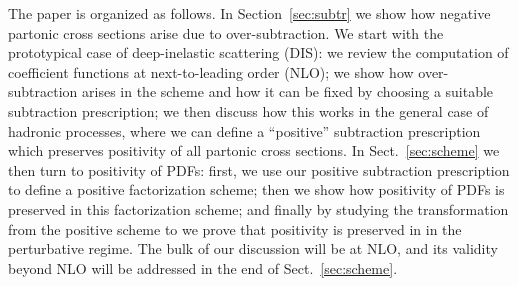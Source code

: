 The paper is organized as follows. In Section~\ref{sec:subtr} we show
how negative partonic cross sections arise due to over-subtraction. We
start with the   prototypical case of deep-inelastic scattering (DIS): we
review the computation of coefficient functions at next-to-leading
order (NLO); we show how over-subtraction arises in the \msbar{} scheme
and how it can be fixed by choosing a suitable subtraction
prescription; we then discuss how this works in the general case of
hadronic processes, where we can define a ``positive'' subtraction prescription
which preserves
positivity of all partonic cross sections.
In Sect.~\ref{sec:scheme} we then turn to
positivity of PDFs: first, we use our positive subtraction
prescription to define a positive factorization scheme; then we show
how positivity of PDFs is preserved in this factorization scheme; and
finally by studying the transformation from the positive scheme to  \msbar{}
we prove that positivity is preserved in \msbar{} in the perturbative
regime. The bulk of our discussion will be at NLO, and its validity
beyond NLO will be addressed in the end of Sect.~\ref{sec:scheme}.

